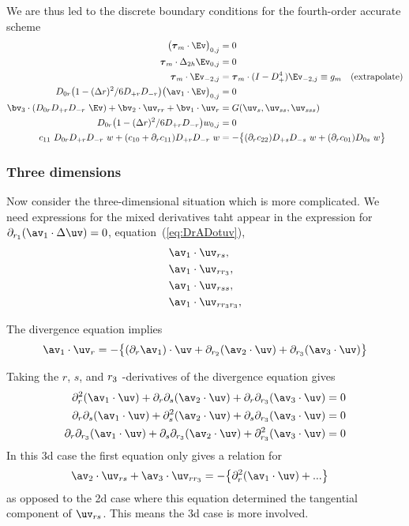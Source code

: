 We are thus led to the discrete boundary conditions for the fourth-order accurate scheme
\begin{align*}
    \big(\tauv_m\cdot\Ev\big)_{0,j}  &=0  \\
 \tauv_m\cdot\Delta_{2h} \Ev_{0,j}  &=0  \\
 \tauv_m\cdot\Ev_{-2,j} &= \tauv_m \cdot (I-D_+^4)\Ev_{-2,j} \equiv g_m   \quad\mbox{(extrapolate)} \\
  D_{0r}\big(1- (\Delta r)^2/6 D_{+r}D_{-r}\big) \big(\av_1\cdot\Ev\big)_{0,j} &= 0 \\
  \bv_3\cdot(D_{0r}D_{+r}D_{-r}~\Ev) + \bv_2\cdot\uv_{rr} + \bv_1\cdot\uv_{r} &= G(\uv_s,\uv_{ss},\uv_{sss})\\
  D_{0r}\big(1- (\Delta r)^2/6 D_{+r}D_{-r}\big) w_{0,j} &= 0 \\
  c_{11}~D_{0r}D_{+r}D_{-r}~w + (c_{10}+\partial_r c_{11})D_{+r}D_{-r}~w &=
        -\big\{ (\partial_r c_{22})D_{+s}D_{-s}~w + (\partial_r c_{01})D_{0s}~w \big\}       
\end{align*}


\subsubsection{Three dimensions}

Now consider the three-dimensional situation which is more complicated.
We need expressions for the mixed derivatives taht appear in the expression for $\pra(\av_1\cdot\Delta\uv)=0$,
equation~(\ref{eq:DrADotuv}),
\begin{align}
   &\av_1\cdot\uv_{rs}, \\
   &\av_1\cdot\uv_{r\rc}, \\
   &\av_1\cdot\uv_{rss}, \\
   &\av_1\cdot\uv_{r\rc\rc},
\end{align}

The divergence equation implies
\[
  \av_1\cdot\uv_r = -\big\{ (\partial_r\av_1)\cdot\uv + \prb(\av_2\cdot\uv)+\prc(\av_3\cdot\uv) \big\}
\]

Taking the $r$, $s$, and ${r_3}$ -derivatives of the divergence equation gives
\begin{align*}
   \partial_r^2(\av_1\cdot\uv) + \partial_r\partial_s(\av_2\cdot\uv)+ \partial_r\partial_\rc(\av_3\cdot\uv) &=0 \\
   \partial_r\partial_s(\av_1\cdot\uv) + \partial_s^2(\av_2\cdot\uv)+ \partial_s\prc(\av_3\cdot\uv) &=0 \\
   \partial_r\prc(\av_1\cdot\uv) + \partial_s\prc(\av_2\cdot\uv)+ \prc^2(\av_3\cdot\uv) &=0
\end{align*}
In this 3d case the first equation only gives a relation for 
\begin{align*}
  \av_2\cdot\uv_{rs} + \av_3\cdot\uv_{r\rc} &= -\big\{ \partial_r^2(\av_1\cdot\uv) + ... \big\} 
\end{align*}
as opposed to the 2d case where this equation determined the tangential component of $\uv_{rs}$. This means
the 3d case is more involved.

